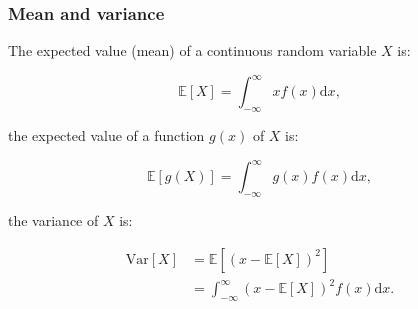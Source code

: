 \documentclass{beamer}
\begin{document}
\begin{frame}
\frametitle{Mean and variance}

The expected value (mean) of a continuous random variable $X$ is:

\begin{equation*}
\mathbb{E}[X] = \int_{-\infty}^\infty x f(x) \mathrm{d}x,
\end{equation*}

\vspace{.1cm}

the expected value of a function $g(x)$ of $X$ is:

\begin{equation*}
\mathbb{E}[g(X)] = \int_{-\infty}^\infty g(x) f(x) \mathrm{d}x,
\end{equation*}

the variance of $X$ is:

\vspace{-.4cm}

\begin{align*}
\mathrm{Var}[X] &= \mathbb{E}[(x - \mathbb{E}[X])^2] \\
&= \int_{-\infty}^\infty (x - \mathbb{E}[X])^2 f(x) \mathrm{d}x.
\end{align*}





\end{frame}
\end{document}
